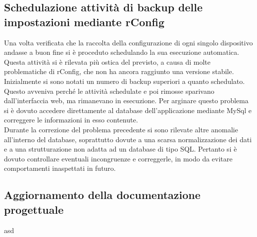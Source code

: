 \documentclass[Realizzazione.tex]{subfiles}
\begin{document}
\subsection{Schedulazione attività di backup delle impostazioni mediante rConfig}
Una volta verificata che la raccolta della configurazione di ogni singolo dispositivo andasse a buon fine si è proceduto schedulando la sua esecuzione automatica. \\
Questa attività si è rilevata più ostica del previsto, a causa di molte problematiche di rConfig, che non ha ancora raggiunto una versione stabile. \\
Inizialmente si sono notati un numero di backup superiori a quanto schedulato. Questo avveniva perché le attività schedulate e poi rimosse sparivano dall'interfaccia web, ma rimanevano in esecuzione. Per arginare questo problema si è dovuto accedere direttamente al database dell'applicazione mediante MySql e correggere le informazioni in esso contenute. \\
Durante la correzione del problema precedente si sono rilevate altre anomalie all'interno del database, soprattutto dovute a una scarsa normalizzazione dei dati e a una strutturazione non adatta ad un database di tipo SQL. Pertanto si è dovuto controllare eventuali incongruenze e correggerle, in modo da evitare comportamenti inaspettati in futuro.

\subsection{Aggiornamento della documentazione progettuale}
asd

	
\end{document}
